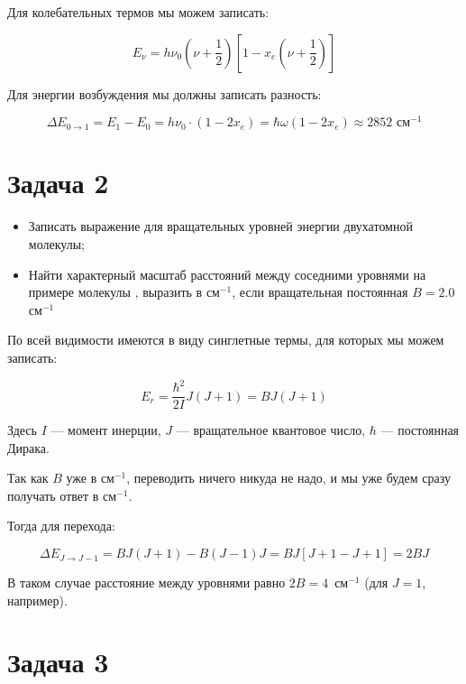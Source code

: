 \documentclass[a4paper, 12pt]{article}
\begin{document}
Для колебательных термов мы можем записать:

\begin{equation}
	E_\nu = h\nu_0 \left(\nu + \frac{1}{2}\right) \left[1 - x_e\left( \nu + \frac{1}{2}\right)\right]
\end{equation}

Для энергии возбуждения мы должны записать разность:

\begin{equation}
	\Delta E_{0\rightarrow1} = E_1 - E_0 = h \nu_0 \cdot (1 - 2 x_e) = \hbar \omega (1 - 2x_e) \approx 2852 \text{ см}^{-1}
\end{equation}


\section*{Задача 2}

\begin{itemize}
	\item Записать выражение для вращательных уровней энергии двухатомной молекулы;
	
	\item Найти характерный масштаб расстояний между соседними уровнями на примере молекулы , выразить в см$^{-1}$, если вращательная постоянная $B = 2.0$ см$^{-1}$
\end{itemize}

По всей видимости имеются в виду синглетные термы, для которых мы можем записать:

\begin{equation}
	E_r = \frac{\hbar^2}{2 I} J(J+1) = B J(J+1)
	\label{eq:E_r}
\end{equation}

Здесь $I$ --- момент инерции, $J$ --- вращательное квантовое число, $\hbar$ --- постоянная Дирака.


Так как $B$ уже в см$^{-1}$, переводить ничего никуда не надо, и мы уже будем сразу получать ответ в см$^{-1}$.

Тогда для перехода:

\begin{equation}
	\Delta E_{J\rightarrow J-1} = BJ(J+1) - B(J-1)J = BJ[J + 1 - J + 1] = 2BJ
	\label{eq:transition}
\end{equation}

В таком случае расстояние между уровнями равно $2B = 4$~см$^{-1}$ (для $J = 1$, например). 

\section*{Задача 3}
\end{document}
